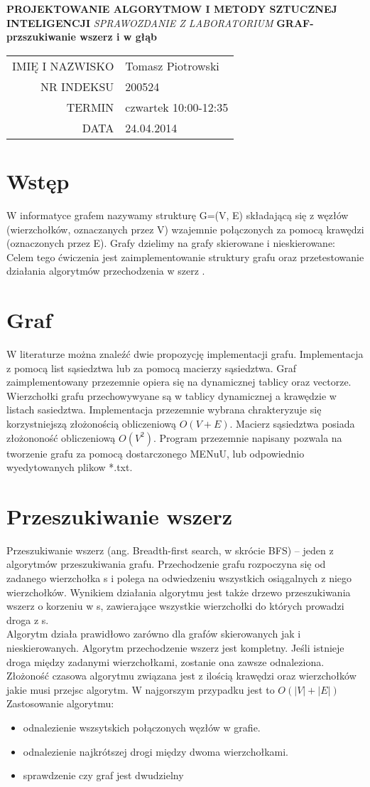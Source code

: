 \documentclass[10pt,oneside]{mwbk}
\renewcommand {\maketitle}{
\begin {titlepage}
\begin {center}
	\LARGE
	\textbf {PROJEKTOWANIE ALGORYTMOW I METODY SZTUCZNEJ INTELIGENCJI}
	\newline
	\newline
	\textit {SPRAWOZDANIE Z  LABORATORIUM}
	\textbf{ GRAF-przszukiwanie wszerz i w głąb}
	\newline
	\begin{table}
	\begin{center}
	\begin{tabular}{rl}
	IMIĘ I NAZWISKO & Tomasz Piotrowski \\
	NR INDEKSU & 200524 \\	
	TERMIN & czwartek 10:00-12:35 \\
	DATA  & 24.04.2014 \\
	\end{tabular}

	\end{center}
	\end{table}
\end {center}
\end {titlepage}}
\begin{document}
\maketitle
\section{Wstęp}
	

	\indent  W informatyce grafem nazywamy strukturę G=(V, E) składającą się z węzłów (wierzchołków, oznaczanych przez V) wzajemnie połączonych za pomocą krawędzi (oznaczonych przez E).
Grafy dzielimy na grafy skierowane i nieskierowane:\\
	
	\indent Celem tego ćwiczenia jest zaimplementowanie struktury grafu oraz przetestowanie działania algorytmów przechodzenia w szerz .
	
\section {Graf}

W literaturze można znaleźć dwie propozycję implementacji grafu. Implementacja z pomocą list sąsiedztwa lub za pomocą macierzy sąsiedztwa.
Graf zaimplementowany przezemnie opiera się na dynamicznej tablicy oraz vectorze. Wierzchołki grafu przechowywyane są w tablicy dynamicznej a krawędzie w listach sasiedztwa. Implementacja przezemnie wybrana chrakteryzuje się korzystniejszą złożonością obliczeniową $O(V+E)$.
Macierz sąsiedztwa posiada złożononość obliczeniową $O(V^2)$.
Program przezemnie napisany pozwala na tworzenie grafu za pomocą dostarczonego MENuU, lub odpowiednio wyedytowanych plikow *.txt.
\section {Przeszukiwanie wszerz}
	Przeszukiwanie wszerz (ang. Breadth-first search, w skrócie BFS) – jeden z  algorytmów przeszukiwania grafu. Przechodzenie grafu rozpoczyna się od zadanego wierzchołka s i polega na odwiedzeniu wszystkich osiągalnych z niego wierzchołków. Wynikiem działania algorytmu jest także drzewo przeszukiwania wszerz o korzeniu w s, zawierające wszystkie wierzchołki do których prowadzi droga z s.\\
	\indent Algorytm działa prawidłowo zarówno dla grafów skierowanych jak i nieskierowanych. Algorytm przechodzenie wszerz jest kompletny. Jeśli istnieje droga między zadanymi wierzchołkami, zostanie ona zawsze odnaleziona.\\
	\indent Złożoność czasowa algorytmu związana jest z ilością krawędzi oraz wierzchołków jakie musi przejsc algorytm. W najgorszym przypadku jest to $O(|V|+|E|)$
	\\Zastosowanie algorytmu:
\begin{itemize}
\item odnalezienie wszsytskich połączonych węzłów w grafie.
\item odnalezienie najkrótszej drogi między dwoma wierzchołkami.
\item sprawdzenie czy graf jest dwudzielny
\end{itemize}
\newpage
\end{document}
